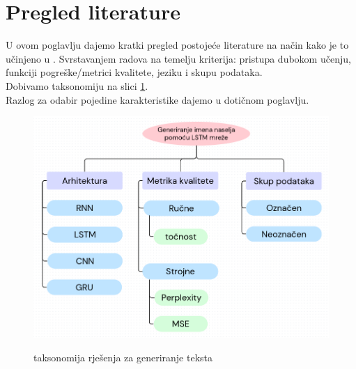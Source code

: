 \documentclass[conference]{IEEEtran}
\begin{document}
\section{Pregled literature}
U ovom poglavlju dajemo kratki pregled postojeće literature na način kako je to učinjeno u \cite{Fatima}. Svrstavanjem radova na temelju kriterija: pristupa dubokom učenju, funkciji pogreške/metrici kvalitete, jeziku i skupu podataka.\\
Dobivamo taksonomiju na slici \ref{pic:takso}.\\
Razlog za odabir pojedine karakteristike dajemo u dotičnom poglavlju.



\begin{figure}[H]
\centering
\includegraphics[angle=90, scale=0.3]{./pics/taksonomija3.png}\\
\caption{taksonomija rješenja za generiranje teksta}
\label{pic:takso}
\end{figure}
\end{document}
